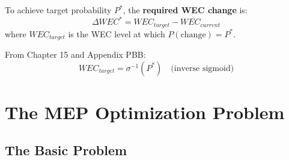\begin{definition}
\label{def:delta-wec}
To achieve target probability $P^*$, the \textbf{required WEC change} is:
\begin{equation}
\Delta WEC^* = WEC_{target} - WEC_{current}
\end{equation}
where $WEC_{target}$ is the WEC level at which $P(\text{change}) = P^*$.

From Chapter 15 and Appendix PBB:
\begin{equation}
WEC_{target} = \sigma^{-1}(P^*) \quad \text{(inverse sigmoid)}
\end{equation}
\end{definition}


\section{The MEP Optimization Problem}
\label{sec:mep-problem}

\subsection{The Basic Problem}

